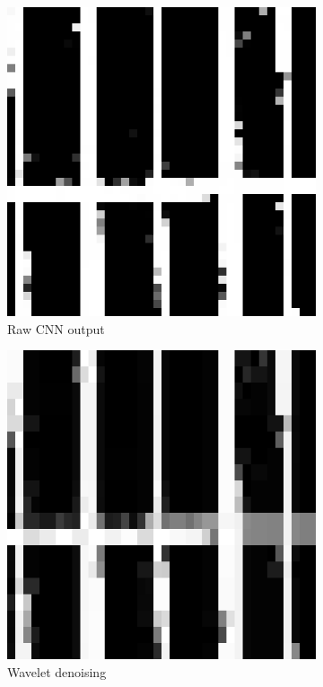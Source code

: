 \documentclass[10pt,conference,compsocconf]{IEEEtran}
\begin{document}
\begin{figure}
\centering
\begin{subfigure}{.3\columnwidth}
  \centering
  \includegraphics[width=.8\linewidth]{output_cnn_raw.png}
  \caption{Raw CNN output}
\end{subfigure}%
\begin{subfigure}{.3\columnwidth}
  \centering
  \includegraphics[width=.8\linewidth]{only_wav.png}
  \caption{Wavelet denoising}
\end{subfigure}
\begin{subfigure}{.3\columnwidth}
  \centering

\end{subfigure}
\end{figure}
\end{document}
